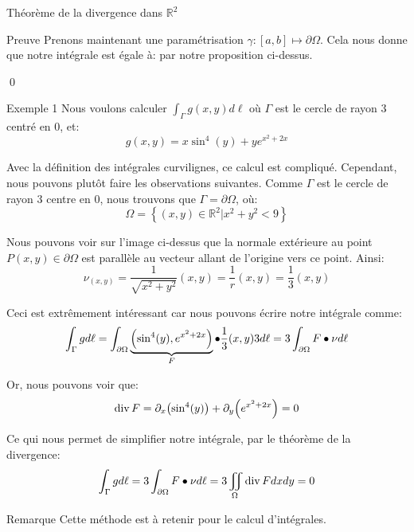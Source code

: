 \documentclass[a4paper]{article}
\begin{document}
\begin{parag}{Théorème de la divergence dans $\mathbb{R}^2$}
\begin{subparag}{Preuve}
        Prenons maintenant une paramétrisation $\gamma: \left[a, b\right] \mapsto \partial \Omega$. Cela nous donne que notre intégrale est égale à: 
        par notre proposition ci-dessus.

        \qed
    \end{subparag}
\end{parag}

\begin{parag}{Exemple 1}
    Nous voulons calculer $\int_{\Gamma} g\left(x, y\right) d \ell $ où $\Gamma$ est le cercle de rayon 3 centré en 0, et: 
    \[g\left(x, y\right) = x\sin^4\left(y\right) + ye^{x^2 + 2x}\]

    Avec la définition des intégrales curvilignes, ce calcul est compliqué. Cependant, nous pouvons plutôt faire les observations suivantes. Comme $\Gamma$ est le cercle de rayon 3 centre en 0, nous trouvons que $\Gamma = \partial\Omega$, où: 
    \[\Omega = \left\{\left(x, y\right) \in \mathbb{R}^2 | x^2 + y^2 < 9\right\}\]
    

    Nous pouvons voir sur l'image ci-dessus que la normale extérieure au point $P\left(x, y\right) \in \partial \Omega$ est parallèle au vecteur allant de l'origine vers ce point. Ainsi: 
    \[\nu_{\left(x, y\right)} = \frac{1}{\sqrt{x^2 + y^2}} \left(x, y\right) = \frac{1}{r} \left(x,y\right) = \frac{1}{3} \left(x, y\right)\]
    
    Ceci est extrêmement intéressant car nous pouvons écrire notre intégrale comme:
    \[\int_{\Gamma} g d \ell = \int_{\partial\Omega} \underbrace{\left(\sin^4\left(y\right), e^{x^2+ 2x}\right)}_{F} \dotprod \frac{1}{3} \left(x, y\right) 3 d \ell = 3\int_{\partial \Omega} F \dotprod \nu d \ell \]
     
    Or, nous pouvons voir que: 
    \[\Div F = \partial_x \left(\sin^4 \left(y\right)\right) + \partial_y\left(e^{x^2 + 2x}\right) = 0\]
    
    Ce qui nous permet de simplifier notre intégrale, par le théorème de la divergence: 
    \[\int_{\Gamma} g d \ell = 3\int_{\partial \Omega}F \bullet \nu d \ell = 3\iint_{\Omega} \operatorname{div} F dxdy = 0\]

    \begin{subparag}{Remarque}
        Cette méthode est à retenir pour le calcul d'intégrales.
    \end{subparag}
    
\end{parag}
\end{document}
